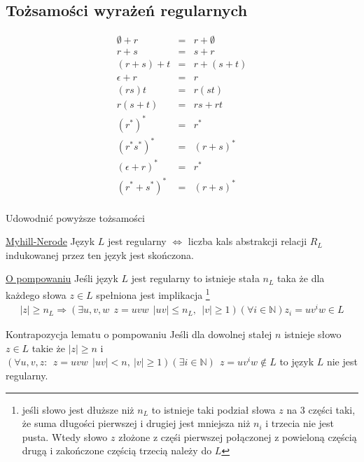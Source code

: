 	\subsection{Tożsamości wyrażeń regularnych}
	\begin{eqnarray}
		\emptyset + r &=& r + \emptyset \\
		r + s &=& s + r \\
		(r+s) + t &=& r + (s+t) \\
		\epsilon + r &=& r \\
		(rs)t &=& r(st) \\
		r(s+t) &=& rs + rt \\
		(r^*)^* &=& r^* \\
		(r^*s^*)^* &=& (r+s)^* \\
		(\epsilon + r)^* &=& r^* \\
		(r^* + s^*)^* &=& (r + s)^*\\		
	\end{eqnarray}
	
	\begin{zad}
		Udowodnić powyższe tożsamości
	\end{zad}
	
	\begin{lemat}{\href{http://pl.wikipedia.org/wiki/Twierdzenie_Myhilla-Nerode%27a}{Myhill-Nerode}}
		Język $L$ jest regularny $\Leftrightarrow$ liczba kals abstrakcji relacji $R_L$ indukowanej przez ten język jest skończona.
	\end{lemat}	
	
	\begin{lemat}{\href{http://pl.wikipedia.org/wiki/Lemat_o_pompowaniu_dla_j\%C4\%99zyk\%C3\%B3w_regularnych}{O pompowaniu}}
		Jeśli język $L$ jest regularny to istnieje stała $n_L$ taka że dla każdego słowa $z\in L$ spełniona jest implikacja
		\footnote{jeśli słowo jest dłuższe niż $n_L$ to istnieje taki podział słowa $z$ na 3 części taki, że suma długości pierwszej
		i drugiej jest mniejsza niż $n_i$ i trzecia nie jest pusta. Wtedy słowo $z$ złożone z częśi pierwszej połączonej z powieloną 
		częścią drugą i zakończone częścią trzecią należy do $L$}
		\begin{eqnarray}
			|z| \geqslant n_L \Rightarrow (\exists u,v,w ~~ z = uvw ~~ |uv| \leqslant n_L, ~~ |v| \geqslant 1)
			(\forall i\in\mathbb{N}) z_i = uv^iw \in L
		\end{eqnarray}
	\end{lemat}
	
	\begin{lemat}{Kontrapozycja lematu o pompowaniu}
		Jeśli dla dowolnej stałej $n$ istnieje słowo $z\in L$ takie że 
		$|z|\geqslant n$ i $(\forall u,v,z: ~~ z = uvw ~~ |uv| < n, ~ |v| \geqslant 1)(\exists i\in\mathbb{N}) ~~ z = uv^iw \not\in L$
		to język $L$ nie jest regularny.
	\end{lemat}


